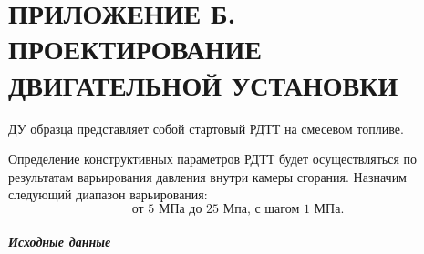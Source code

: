 \chapter{ПРИЛОЖЕНИЕ Б. \\ ПРОЕКТИРОВАНИЕ ДВИГАТЕЛЬНОЙ УСТАНОВКИ}
\label{chapter:appendix_rdtt}
ДУ образца представляет собой стартовый РДТТ на смесевом топливе.

Определение конструктивных параметров РДТТ будет осуществляться по результатам варьирования давления внутри камеры сгорания. Назначим следующий диапазон варьирования:
\[ \text{от 5 МПа до 25 Мпа, с шагом 1 МПа.}
\]

\paragraph{Исходные данные}

